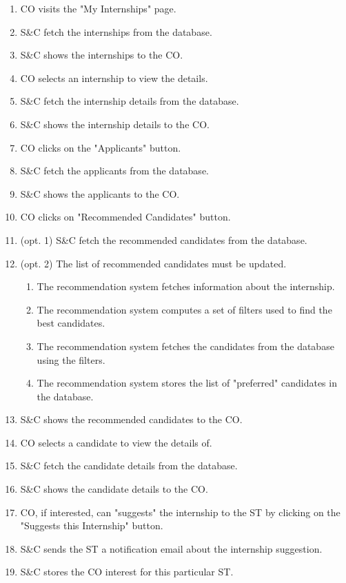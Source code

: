 \begin{enumerate}
    \item CO visits the "My Internships" page.
    \item S\&C fetch the internships from the database.
    \item S\&C shows the internships to the CO.
    \item CO selects an internship to view the details.
    \item S\&C fetch the internship details from the database.
    \item S\&C shows the internship details to the CO.
    \item CO clicks on the "Applicants" button.
    \item S\&C fetch the applicants from the database.
    \item S\&C shows the applicants to the CO.
    \item CO clicks on "Recommended Candidates" button.
    \item (opt. 1) S\&C fetch the recommended candidates from the database.
    \item (opt. 2) The list of recommended candidates must be updated.
    \begin{enumerate}
        \item The recommendation system fetches information about the internship.
        \item The recommendation system computes a set of filters used to find the best candidates.
        \item The recommendation system fetches the candidates from the database using the filters.
        \item The recommendation system stores the list of "preferred" candidates in the database.
    \end{enumerate}
    \item S\&C shows the recommended candidates to the CO.
    \item CO selects a candidate to view the details of.
    \item S\&C fetch the candidate details from the database.
    \item S\&C shows the candidate details to the CO.
    \item CO, if interested, can "suggests" the internship to the ST by clicking on the "Suggests this Internship" button.
    \item S\&C sends the ST a notification email about the internship suggestion.
    \item S\&C stores the CO interest for this particular ST.
\end{enumerate}

